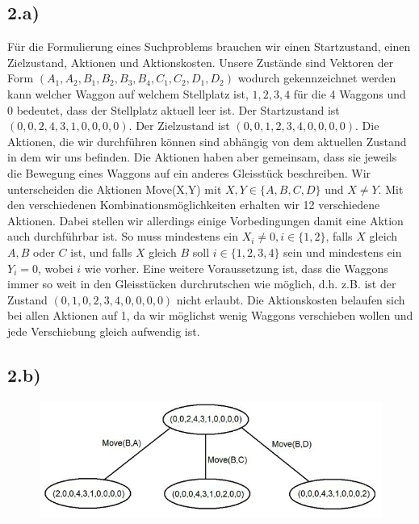 \documentclass[a4paper]{article}
\begin{document}
\subsection*{2.a)}
F\"ur die Formulierung eines Suchproblems brauchen wir einen Startzustand, einen Zielzustand, Aktionen und Aktionskosten. Unsere Zustände sind Vektoren der Form $(A_1,A_2,B_1,B_2,B_3,B_4,C_1,C_2,D_1,D_2)$ wodurch gekennzeichnet werden kann welcher Waggon auf welchem Stellplatz ist, $1,2,3,4$ f\"ur die 4 Waggons und 0 bedeutet, dass der Stellplatz aktuell leer ist. Der Startzustand ist $(0,0,2,4,3,1,0,0,0,0)$. Der Zielzustand ist $(0,0,1,2,3,4,0,0,0,0)$. Die Aktionen, die wir durchf\"uhren k\"onnen sind abh\"angig von dem aktuellen Zustand in dem wir uns befinden. Die Aktionen haben aber gemeinsam, dass sie jeweils die Bewegung eines Waggons auf ein anderes Gleisst\"uck beschreiben.
Wir unterscheiden die Aktionen Move(X,Y) mit $X,Y \in \{A,B,C,D\}$ und $X \not= Y$. Mit den verschiedenen Kombinationsmöglichkeiten erhalten wir 12 verschiedene Aktionen. Dabei stellen wir allerdings einige Vorbedingungen damit eine Aktion auch durchf\"uhrbar ist. So muss mindestens ein $X_i \not= 0, i \in \{1,2\}$, falls $X$ gleich $A,B$ oder $C$ ist, und falls $X$ gleich $B$ soll $i \in \{1,2,3,4\}$ sein und mindestens ein $Y_i = 0$, wobei $i$ wie vorher.
Eine weitere Voraussetzung ist, dass die Waggons immer so weit in den Gleisst\"ucken durchrutschen wie m\"oglich, d.h. z.B. ist der Zustand $(0,1,0,2,3,4,0,0,0,0)$ nicht erlaubt.
Die Aktionskosten belaufen sich bei allen Aktionen auf 1, da wir m\"oglichst wenig Waggons verschieben wollen und jede Verschiebung gleich aufwendig ist.

\subsection*{2.b)}

\begin{figure}[h]
\centering
\includegraphics[width=0.75\columnwidth]{aufgabe2b}
\end{figure}
\end{document}
